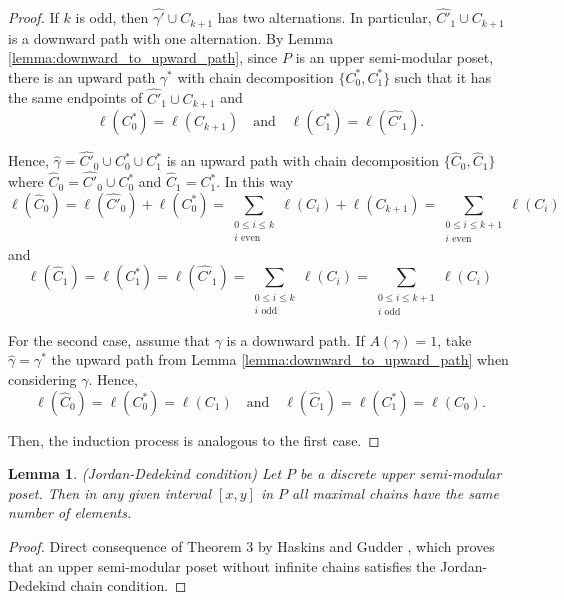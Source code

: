\documentclass{article}[12pt]
\theoremstyle{exampstyle}
\newtheorem{lemma}[theorem]{Lemma}
\theoremstyle{remark}
\begin{document}
\begin{proof}
    If $k$ is odd, then $\hat{\gamma'} \cup C_{k+1}$ has two alternations. In particular, $\hat{C'}_1 \cup C_{k+1}$ is a downward path with one alternation. By Lemma \ref{lemma:downward_to_upward_path}, since $P$ is an upper semi-modular poset, there is an upward path $\gamma^*$ with chain decomposition $\{C^*_0, C^*_1\}$ such that it has the same endpoints of $\hat{C'}_1 \cup C_{k+1}$ and
    \[ \ell(C^*_0) = \ell(C_{k+1}) \quad \text{and} \quad \ell(C^*_1) = \ell({\hat{C'}_1}).\]

    Hence, $\hat{\gamma} =  \hat{C'}_0 \cup C^*_0 \cup C^*_1$ is an upward path with chain decomposition $\{\hat{C}_0, \hat{C}_1 \}$ where $\hat{C}_0 = \hat{C'}_0 \cup C^*_0$ and $ \hat{C}_1 = C^*_1 $. In this way
    \[ 
    \ell(\hat{C}_0 ) = \ell(\hat{C'}_0) + \ell(C^*_0) = \sum\limits_{\substack{0 \leq i \leq k \\ i \text{ even}}} \ell(C_i) + \ell(C_{k+1}) = \sum\limits_{\substack{0 \leq i \leq k+1 \\ i \text{ even}}} \ell(C_i)\]
    and 
    \[\ell(\hat{C}_1 ) = \ell(C^*_1) = \ell(\hat{C'}_1) = \sum\limits_{\substack{0 \leq i \leq k \\ i \text{ odd}}} \ell(C_i)  = \sum\limits_{\substack{0 \leq i \leq k+1 \\ i \text{ odd}}} \ell(C_i)\]

    For the second case, assume that $\gamma$ is a downward path. If $A(\gamma) = 1$, take $\hat{\gamma}=\gamma^* $ the upward path from Lemma \ref{lemma:downward_to_upward_path} when considering $\gamma$. Hence,
    \[\ell(\hat{C}_0) = \ell(C^*_0) = \ell(C_1) \quad \text{and} \quad \ell(\hat{C}_1) = \ell(C^*_1) = \ell(C_0). \]
    
    Then, the induction process is analogous to the first case. 
\end{proof}

\begin{lemma}
    (Jordan-Dedekind condition) Let $P$ be a discrete upper semi-modular poset. Then in any given interval $[x, y]$ in $P$ all maximal chains have the same number of elements.
    \label{lemma:Jordan-Dedekind}
\end{lemma}
\begin{proof}
    Direct consequence of Theorem 3 by Haskins and Gudder \cite{haskins1971semimodular}, which proves that an upper semi-modular poset without infinite chains satisfies the Jordan-Dedekind chain condition.
\end{proof}
\end{document}
